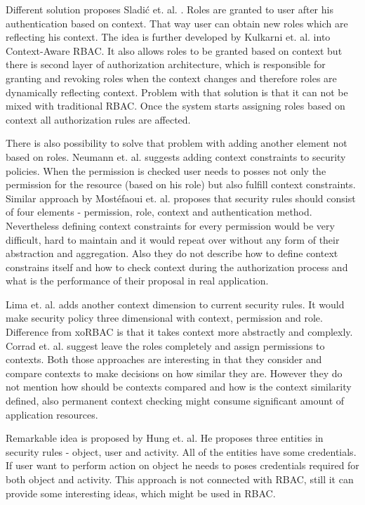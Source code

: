 \documentclass{poster15}
\begin{document}
Different solution proposes Sladi\'c et. al. \cite{contextaccess}. Roles are granted to user after his authentication based on context. That way user can obtain new roles which are reflecting his context. The idea is further developed by Kulkarni et. al. \cite{contextawarerbac} into Context-Aware RBAC. It also allows roles to be granted based on context but there is second layer of authorization architecture, which is responsible for granting and revoking roles when the context changes and therefore roles are dynamically reflecting context. Problem with that solution is that it can not be mixed with traditional RBAC. Once the system starts assigning roles based on context all authorization rules are affected. 

There is also possibility to solve that problem with adding another element not based on roles. Neumann et. al. \cite{xorbac} suggests adding context constraints to security policies. When the permission is checked user needs to posses not only the permission for the resource (based on his role) but also fulfill context constraints. Similar approach by Most\'efaoui et. al. \cite{genericcontext} proposes that security rules should consist of four elements - permission, role, context and authentication method. Nevertheless defining context constraints for every permission would be very difficult, hard to maintain and it would repeat over without any form of their abstraction and aggregation. Also they do not describe how to define context constrains itself and how to check context during the authorization process and what is the performance of their proposal in real application.

Lima et. al. \cite{contextlayer} adds another context dimension to current security rules. It would make security policy three dimensional with context, permission and role. Difference from xoRBAC \cite{xorbac} is that it takes context more abstractly and complexly. Corrad et. al. \cite{ubiscom} suggest leave the roles completely and assign permissions to contexts. Both those approaches are interesting in that they consider and compare contexts to make decisions on how similar they are. However they do not mention how should be contexts compared and how is the context similarity defined, also permanent context checking might consume significant amount of application resources.

Remarkable idea is proposed by Hung et. al. \cite{hung} He proposes three entities in security rules - object, user and activity. All of the entities have some credentials. If user want to perform action on object he needs to poses credentials required for both object and activity. This approach is not connected with RBAC, still it can provide some interesting ideas, which might be used in RBAC.
\end{document}
